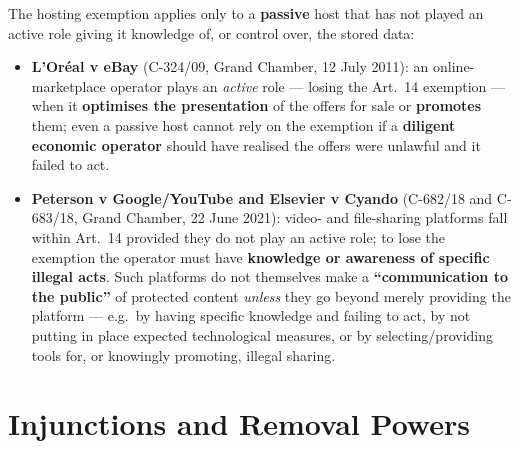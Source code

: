 \documentclass[11pt,a4paper,openany]{report}
\theoremstyle{definition}
\theoremstyle{plain}
\theoremstyle{remark}
\begin{document}
The hosting exemption applies only to a \textbf{passive} host that has not played an active role giving it knowledge of, or control over, the stored data:
\begin{itemize}
    \item \textbf{L'Or\'eal v eBay} (C-324/09, Grand Chamber, 12 July 2011): an online-marketplace operator plays an \emph{active} role --- losing the Art.\ 14 exemption --- when it \textbf{optimises the presentation} of the offers for sale or \textbf{promotes} them; even a passive host cannot rely on the exemption if a \textbf{diligent economic operator} should have realised the offers were unlawful and it failed to act.
    \item \textbf{Peterson v Google/YouTube and Elsevier v Cyando} (C-682/18 and C-683/18, Grand Chamber, 22 June 2021): video- and file-sharing platforms fall within Art.\ 14 provided they do not play an active role; to lose the exemption the operator must have \textbf{knowledge or awareness of specific illegal acts}. Such platforms do not themselves make a \textbf{``communication to the public''} of protected content \emph{unless} they go beyond merely providing the platform --- e.g.\ by having specific knowledge and failing to act, by not putting in place expected technological measures, or by selecting/providing tools for, or knowingly promoting, illegal sharing.
\end{itemize}

\section{Injunctions and Removal Powers}
\end{document}
